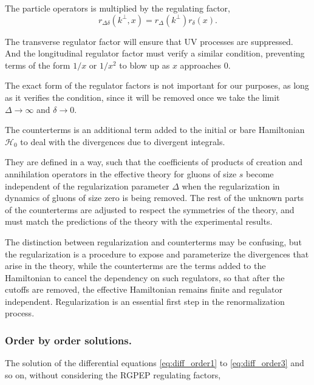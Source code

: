 \documentclass[11pt,a4paper,twoside,pdf]{article}
\numberwithin{equation}{section}
\begin{document}
The particle operators is multiplied by the regulating factor, 
\begin{equation}
    r_{\Delta \delta} (k^\perp, x) = r_\Delta (k^\perp) r_\delta(x).
\end{equation}

The transverse regulator factor will ensure that UV processes are suppressed.
And the longitudinal regulator factor must verify a similar condition, preventing terms
of the form $1/x$ or $1/x^2$ to blow up as $x$ approaches 0. 

The exact form of the regulator factors is not important for our purposes, as long as it 
verifies the condition, since it will be removed once we take the
limit $\Delta \to \infty$ and $\delta \to 0$.

The counterterms is an additional term added to the initial or bare Hamiltonian 
$\mathcal{H}_0$ to deal with the divergences due to divergent integrals. 

They are defined in a way, such that the coefficients of products 
of creation and annihilation operators in the effective theory for gluons of size $s$
become independent of the regularization parameter $\Delta$ when the regularization
in dynamics of gluons of size zero is being removed. The rest of the unknown parts 
of the counterterms are adjusted to respect the symmetries of the theory, and must 
match the predictions of the theory with the experimental results.

The distinction between regularization and counterterms may be confusing, but the
regularization is a procedure to expose and parameterize the divergences that arise
in the theory, while the counterterms are the terms added to the Hamiltonian to 
cancel the dependency on such regulators, so that after the cutoffs are removed, the 
effective Hamiltonian remains finite and regulator independent. Regularization is
an essential first step in the renormalization process.

\subsubsection{Order by order solutions.} \label{sec:orderbyorder_solutions}

The solution of the differential equations \eqref{eq:diff_order1} to \eqref{eq:diff_order3} 
and so on, without considering the RGPEP regulating factors,
\end{document}

